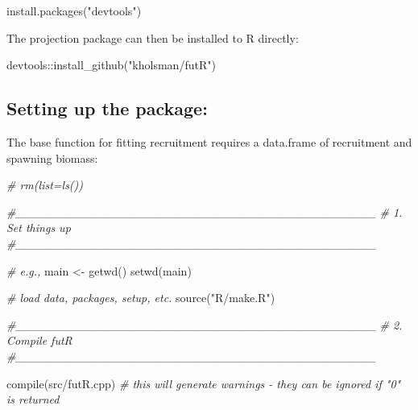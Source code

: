 \documentclass[
]{article}
\newenvironment{Shaded}{\begin{snugshade}}{\end{snugshade}}
\newcommand{\CommentTok}[1]{\textcolor[rgb]{0.56,0.35,0.01}{\textit{#1}}}
\newcommand{\FunctionTok}[1]{\textcolor[rgb]{0.00,0.00,0.00}{#1}}
\newcommand{\NormalTok}[1]{#1}
\newcommand{\OtherTok}[1]{\textcolor[rgb]{0.56,0.35,0.01}{#1}}
\newcommand{\SpecialCharTok}[1]{\textcolor[rgb]{0.00,0.00,0.00}{#1}}
\newcommand{\StringTok}[1]{\textcolor[rgb]{0.31,0.60,0.02}{#1}}
\begin{document}
\begin{Shaded}
\begin{Highlighting}[]
\FunctionTok{install.packages}\NormalTok{(}\StringTok{"devtools"}\NormalTok{)}
\end{Highlighting}
\end{Shaded}

The projection package can then be installed to R directly:

\begin{Shaded}
\begin{Highlighting}[]
\NormalTok{devtools}\SpecialCharTok{::}\FunctionTok{install\_github}\NormalTok{(}\StringTok{"kholsman/futR"}\NormalTok{)}
\end{Highlighting}
\end{Shaded}

\hypertarget{setting-up-the-package}{%
\subsection{Setting up the package:}\label{setting-up-the-package}}

The base function for fitting recruitment requires a data.frame of
recruitment and spawning biomass:

\begin{Shaded}
\begin{Highlighting}[]
 \CommentTok{\# rm(list=ls())}
   
  \CommentTok{\#\_\_\_\_\_\_\_\_\_\_\_\_\_\_\_\_\_\_\_\_\_\_\_\_\_\_\_\_\_\_\_\_\_\_\_\_\_\_\_\_\_\_\_}
  \CommentTok{\# 1. Set things up}
  \CommentTok{\#\_\_\_\_\_\_\_\_\_\_\_\_\_\_\_\_\_\_\_\_\_\_\_\_\_\_\_\_\_\_\_\_\_\_\_\_\_\_\_\_\_\_\_}
  
  \CommentTok{\# e.g., }
\NormalTok{  main  }\OtherTok{\textless{}{-}}  \FunctionTok{getwd}\NormalTok{()}
  \FunctionTok{setwd}\NormalTok{(main)}
  
  \CommentTok{\# load data, packages, setup, etc.}
  \FunctionTok{source}\NormalTok{(}\StringTok{"R/make.R"}\NormalTok{)}
    
  \CommentTok{\#\_\_\_\_\_\_\_\_\_\_\_\_\_\_\_\_\_\_\_\_\_\_\_\_\_\_\_\_\_\_\_\_\_\_\_\_\_\_\_\_\_\_\_}
  \CommentTok{\# 2. Compile futR }
  \CommentTok{\#\_\_\_\_\_\_\_\_\_\_\_\_\_\_\_\_\_\_\_\_\_\_\_\_\_\_\_\_\_\_\_\_\_\_\_\_\_\_\_\_\_\_\_}
  
  \FunctionTok{compile}\NormalTok{(}\StringTok{\textquotesingle{}src/futR.cpp\textquotesingle{}}\NormalTok{) }\CommentTok{\# this will generate warnings {-} they can be ignored if "0" is returned}
\end{Highlighting}
\end{Shaded}
\end{document}
